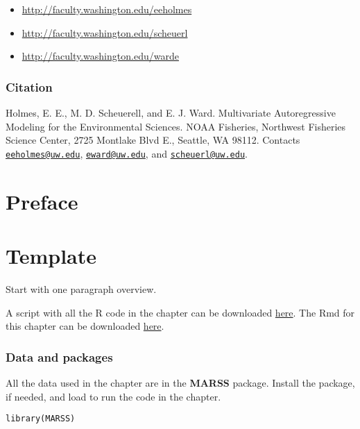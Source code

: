 \documentclass[
  12pt,
]{book}
\providecommand{\tightlist}{%
  \setlength{\itemsep}{0pt}\setlength{\parskip}{0pt}}
\begin{document}
\begin{itemize}
\tightlist
\item
  \url{http://faculty.washington.edu/eeholmes}
\item
  \url{http://faculty.washington.edu/scheuerl}
\item
  \url{http://faculty.washington.edu/warde}
\end{itemize}

\hypertarget{citation}{%
\subsection*{Citation}\label{citation}}


Holmes, E. E., M. D. Scheuerell, and E. J. Ward. Multivariate Autoregressive Modeling for the Environmental Sciences. NOAA Fisheries, Northwest Fisheries Science Center, 2725 Montlake Blvd E., Seattle, WA 98112. Contacts \href{mailto:eeholmes@uw.edu}{\nolinkurl{eeholmes@uw.edu}}, \href{mailto:eward@uw.edu}{\nolinkurl{eward@uw.edu}}, and \href{mailto:scheuerl@uw.edu}{\nolinkurl{scheuerl@uw.edu}}.

\hypertarget{preface-1}{%
\chapter*{Preface}\label{preface-1}}


\hypertarget{template}{%
\chapter{Template}\label{template}}

Start with one paragraph overview.

A script with all the R code in the chapter can be downloaded
\href{./Rcode/template.R}{here}. The Rmd for this chapter can be downloaded
\href{./Rmds/template.Rmd}{here}.

\hypertarget{data-and-packages}{%
\subsection{Data and packages}\label{data-and-packages}}

All the data used in the chapter are in the \textbf{MARSS} package. Install
the package, if needed, and load to run the code in the chapter.

\begin{verbatim}
library(MARSS)
\end{verbatim}
\end{document}
